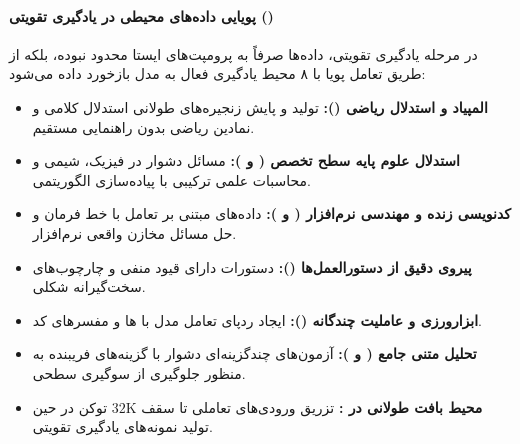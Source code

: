 \paragraph*{پویایی داده‌های محیطی در یادگیری تقویتی ()}
در مرحله یادگیری تقویتی، داده‌ها صرفاً به پرومپت‌های ایستا محدود نبوده، بلکه از طریق تعامل پویا با ۸ محیط یادگیری فعال به مدل بازخورد داده می‌شود:
\begin{itemize}
    \item \textbf{المپیاد و استدلال ریاضی ():} تولید و پایش زنجیره‌های طولانی استدلال کلامی و نمادین ریاضی بدون راهنمایی مستقیم.
    \item \textbf{استدلال علوم پایه سطح تخصص ( و ):} مسائل دشوار در فیزیک، شیمی و محاسبات علمی ترکیبی با پیاده‌سازی الگوریتمی.
    \item \textbf{کدنویسی زنده و مهندسی نرم‌افزار ( و ):} داده‌های مبتنی بر تعامل با خط فرمان و حل مسائل مخازن واقعی نرم‌افزار.
    \item \textbf{پیروی دقیق از دستورالعمل‌ها ():} دستورات دارای قیود منفی و چارچوب‌های سخت‌گیرانه شکلی.
    \item \textbf{ابزارورزی و عاملیت چندگانه ():} ایجاد ردپای تعامل مدل با ها و مفسرهای کد.
    \item \textbf{تحلیل متنی جامع ( و ):} آزمون‌های چندگزینه‌ای دشوار با گزینه‌های فریبنده به منظور جلوگیری از سوگیری سطحی.
    \item \textbf{محیط بافت طولانی در :} تزریق ورودی‌های تعاملی تا سقف $32\text{K}$ توکن در حین تولید نمونه‌های یادگیری تقویتی.
\end{itemize}

